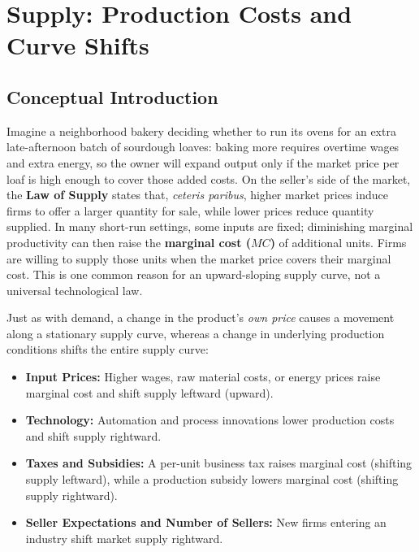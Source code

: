 \documentclass[11pt,letterpaper]{article}
\begin{document}
\section{Supply: Production Costs and Curve Shifts}

\subsection*{Conceptual Introduction}
Imagine a neighborhood bakery deciding whether to run its ovens for an extra late-afternoon batch of sourdough loaves: baking more requires overtime wages and extra energy, so the owner will expand output only if the market price per loaf is high enough to cover those added costs. On the seller's side of the market, the \textbf{Law of Supply} states that, \emph{ceteris paribus}, higher market prices induce firms to offer a larger quantity for sale, while lower prices reduce quantity supplied. In many short-run settings, some inputs are fixed; diminishing marginal productivity can then raise the \textbf{marginal cost ($MC$)} of additional units. Firms are willing to supply those units when the market price covers their marginal cost. This is one common reason for an upward-sloping supply curve, not a universal technological law.

Just as with demand, a change in the product's \emph{own price} causes a movement along a stationary supply curve, whereas a change in underlying production conditions shifts the entire supply curve:
\begin{itemize}
    \item \textbf{Input Prices:} Higher wages, raw material costs, or energy prices raise marginal cost and shift supply leftward (upward).
    \item \textbf{Technology:} Automation and process innovations lower production costs and shift supply rightward.
    \item \textbf{Taxes and Subsidies:} A per-unit business tax raises marginal cost (shifting supply leftward), while a production subsidy lowers marginal cost (shifting supply rightward).
    \item \textbf{Seller Expectations and Number of Sellers:} New firms entering an industry shift market supply rightward.
\end{itemize}
\end{document}
